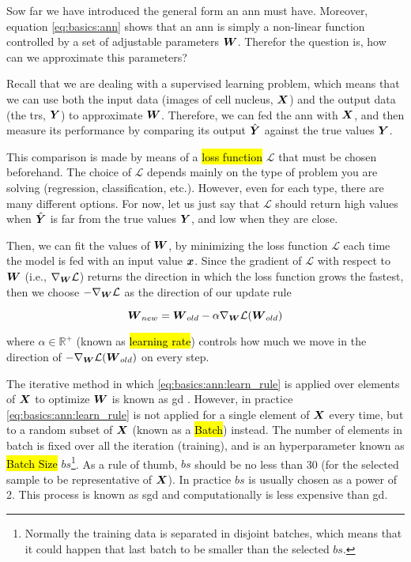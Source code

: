 Sow far we have introduced the general form an \gls{ann} must have. Moreover, equation \ref{eq:basics:ann} shows that an \gls{ann} is simply a non-linear function controlled by a set of adjustable parameters $\boldsymbol{W}$. Therefor the question is, how can we approximate this parameters?

Recall that we are dealing with a supervised learning problem, which means that we can use both the input data (images of cell nucleus, $\boldsymbol{X}$) and the output data (the \glspl{tr}, $\boldsymbol{Y}$) to approximate $\boldsymbol{W}$. Therefore, we can fed the \gls{ann} with $\boldsymbol{X}$, and then measure its performance by comparing its output $\hat{\boldsymbol{Y}}$ against the true values $\boldsymbol{Y}$.

This comparison is made by means of a \hl{loss function} $\mathcal{L}$ that must be chosen beforehand. The choice of $\mathcal{L}$ depends mainly on the type of problem you are solving (regression, classification, etc.). However, even for each type, there are many different options. For now, let us just say that $\mathcal{L}$ should return high values when $\hat{\boldsymbol{Y}}$ is far from the true values $\boldsymbol{Y}$, and low when they are close.

Then, we can fit the values of $\boldsymbol{W}$, by minimizing the loss function $\mathcal{L}$ each time the model is fed with an input value $\boldsymbol{x}$. Since the gradient of $\mathcal{L}$ with respect to $\boldsymbol{W}$ (i.e., $ \nabla_{\boldsymbol{W}} \mathcal{L}$) returns the direction in which the loss function grows the fastest, then we choose $- \nabla_{\boldsymbol{W}} \mathcal{L}$ as the direction of our update rule

\begin{equation}
  \boldsymbol{W}_{new} = \boldsymbol{W}_{old} - \alpha \nabla_{\boldsymbol{W}} \mathcal{L}(\boldsymbol{W}_{old})
  \label{eq:basics:ann:learn_rule}
\end{equation}

\noindent where $\alpha \in \mathbb{R}^+$ (known as \hl{learning rate}) controls how much we move in the direction of $-\nabla_{\boldsymbol{W}} \mathcal{L}(\boldsymbol{W}_{old})$ on every step.

The iterative method in which \ref{eq:basics:ann:learn_rule} is applied over elements of $\boldsymbol{X}$ to optimize $\boldsymbol{W}$ is known as \gls{gd} \cite{bishop2006pattern}.
However, in practice \ref{eq:basics:ann:learn_rule} is not applied for a single element of $\boldsymbol{X}$ every time, but to a random subset of $\boldsymbol{X}$ (known as a \hl{Batch}) instead.
The number of elements in batch is fixed over all the iteration (training), and is an hyperparameter known as \hl{Batch Size} $bs$\footnote{Normally the training data is separated in disjoint batches, which means that it could happen that last batch to be smaller than the selected $bs$.}.
As a rule of thumb, $bs$ should be no less than 30 (for the selected sample to be representative of $\boldsymbol{X}$). In practice $bs$ is usually chosen as a power of 2.
This process is known as \gls{sgd} and computationally is less  expensive than \gls{gd}.

